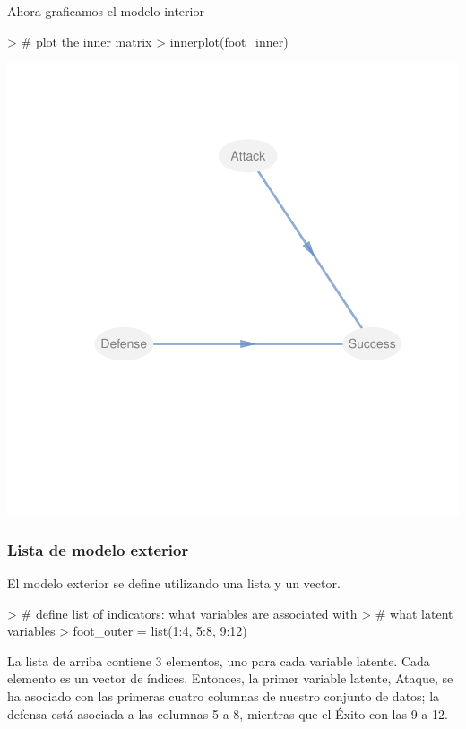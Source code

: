 \documentclass{paper}
\begin{document}
Ahora graficamos el modelo interior
\begin{center}
\begin{Schunk}
\begin{Sinput}
> # plot the inner matrix
> innerplot(foot_inner)
\end{Sinput}
\end{Schunk}
\includegraphics{notas_PLS-006}
\end{center}

\subsubsection{Lista de modelo exterior}

El modelo exterior se define utilizando una lista y un vector.
\begin{Schunk}
\begin{Sinput}
> # define list of indicators: what variables are associated with
> # what latent variables
> foot_outer = list(1:4, 5:8, 9:12)
\end{Sinput}
\end{Schunk}
La lista de arriba contiene 3 elementos, uno para cada variable latente. Cada elemento es un vector de \'indices. Entonces, la primer variable latente, Ataque, se ha asociado con las primeras cuatro columnas de nuestro conjunto de datos; la defensa est\'a asociada a las columnas 5 a 8, mientras que el \'Exito con las 9 a 12.
\end{document}
